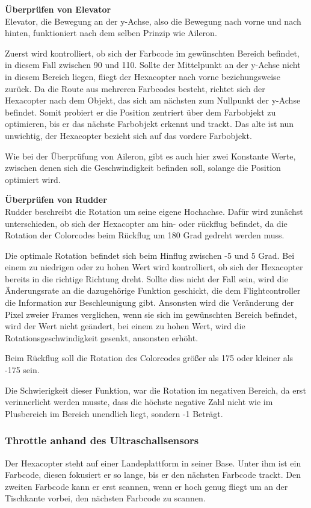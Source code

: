     \textbf{Überprüfen von Elevator}\\
    Elevator, die Bewegung an der y-Achse, also die Bewegung nach vorne und nach hinten, funktioniert nach dem selben Prinzip wie Aileron.

    Zuerst wird kontrolliert, ob sich der Farbcode im gewünschten Bereich befindet, in diesem Fall zwischen 90 und 110.
    Sollte der Mittelpunkt an der y-Achse nicht in diesem Bereich liegen, fliegt der Hexacopter nach vorne beziehungsweise zurück.
    Da die Route aus mehreren Farbcodes besteht, richtet sich der Hexacopter nach dem Objekt, das sich am nächsten zum Nullpunkt der y-Achse befindet. Somit probiert er die Position zentriert über dem Farbobjekt zu optimieren, bis er das nächste Farbobjekt erkennt und trackt. Das alte ist nun unwichtig, der Hexacopter bezieht sich auf das vordere Farbobjekt.

    Wie bei der Überprüfung von Aileron, gibt es auch hier zwei Konstante Werte, zwischen denen sich die Geschwindigkeit befinden soll, solange die Position optimiert wird.

    \textbf{Überprüfen von Rudder}\\
    Rudder beschreibt die Rotation um seine eigene Hochachse. Dafür wird zunächst unterschieden, ob sich der Hexacopter am hin- oder rückflug befindet, da die Rotation der Colorcodes beim Rückflug um 180 Grad gedreht werden muss.

    Die optimale Rotation befindet sich beim Hinflug zwischen -5 und 5 Grad.
    Bei einem zu niedrigen oder zu hohen Wert wird kontrolliert, ob sich der Hexacopter bereits in die richtige Richtung dreht.
    Sollte dies nicht der Fall sein, wird die Änderungsrate an die dazugehörige Funktion geschickt, die dem Flightcontroller die Information zur Beschleunigung gibt.
    Ansonsten wird die Veränderung der Pixel zweier Frames verglichen, wenn sie sich im gewünschten Bereich befindet, wird der Wert nicht geändert, bei einem zu hohen Wert, wird die Rotationsgeschwindigkeit gesenkt, ansonsten erhöht.

    Beim Rückflug soll die Rotation des Colorcodes größer als 175 oder kleiner als -175 sein.

    Die Schwierigkeit dieser Funktion, war die Rotation im negativen Bereich, da erst verinnerlicht werden musste, dass die höchste negative Zahl nicht wie im Plusbereich im Bereich unendlich liegt, sondern -1 Beträgt.


    \subsubsection{Throttle anhand des Ultraschallsensors}
    Der Hexacopter steht auf einer Landeplattform in seiner Base. Unter ihm ist ein Farbcode, diesen fokusiert er so lange, bis er den nächsten Farbcode trackt. Den zweiten Farbcode kann er erst scannen, wenn er hoch genug fliegt um an der Tischkante vorbei, den nächsten Farbcode zu scannen.


